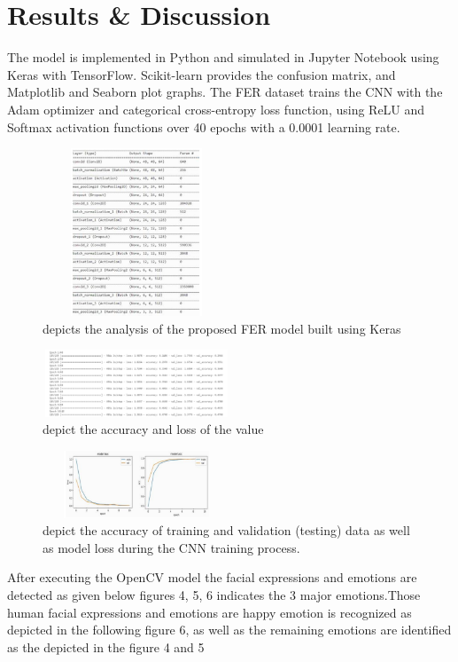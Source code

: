 \documentclass[conference]{IEEEtran}
\begin{document}
\section{Results \& Discussion}

The model is implemented in Python and simulated in Jupyter Notebook using Keras with TensorFlow. Scikit-learn provides the confusion matrix, and Matplotlib and Seaborn plot graphs. The FER dataset trains the CNN with the Adam optimizer and categorical cross-entropy loss function, using ReLU and Softmax activation functions over 40 epochs with a 0.0001 learning rate.

\begin{figure}[h]
    \centering
    \includegraphics[width=0.5\textwidth, height=5cm]{anh1.png}
    \caption{depicts the analysis of the proposed FER model built using Keras
}
    \label{fig:anh1}
 
\end{figure}

\begin{figure}[h]
    \centering
    \includegraphics[width=0.5\textwidth, height=2cm]{anh2.png}
    \caption{depict the accuracy and loss of the value }
    \label{fig:anh2}
\end{figure}

\begin{figure}[h]
    \centering
    \includegraphics[width=0.5\textwidth, height=2cm]{anh3.png}
    \caption{depict the accuracy of training and validation (testing) data as well as model loss during the CNN training process. }
    \label{fig:anh3}
\end{figure}
After executing the OpenCV model the facial expressions and emotions are detected as given below figures 4, 5, 6 indicates the 3 major emotions.Those human facial expressions and emotions are happy emotion is recognized as depicted in the following figure 6, as well as the remaining emotions are identified as the depicted in the figure 4 and 5
\end{document}
